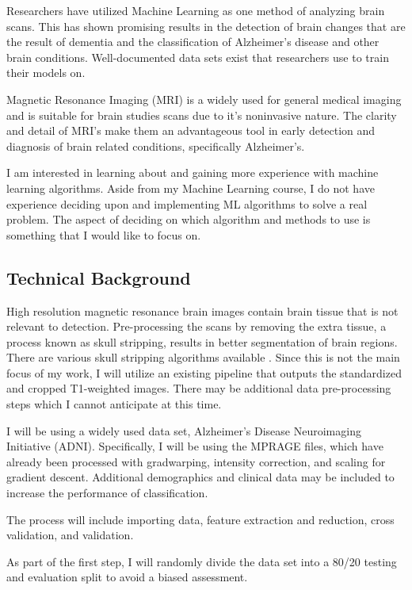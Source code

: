 \documentclass[10pt,twocolumn]{article}
\begin{document}
Researchers have utilized Machine Learning as one method of analyzing brain scans. This has shown promising results in the detection of brain changes that are the result of dementia and the classification of Alzheimer's disease and other brain conditions. Well-documented data sets exist that researchers use to train their models on. 

Magnetic Resonance Imaging (MRI) is a widely used for general medical imaging and is suitable for brain studies scans due to it's noninvasive nature. The clarity and detail of MRI's make them an advantageous tool in early detection and diagnosis of brain related conditions, specifically Alzheimer's. 

I am interested in learning about and gaining more experience with machine learning algorithms. Aside from my Machine Learning course, I do not have experience deciding upon and implementing ML algorithms to solve a real problem. The aspect of deciding on which algorithm and methods to use is something that I would like to focus on. 

\subsection{Technical Background}
High resolution magnetic resonance brain images contain brain tissue that is not relevant to detection. Pre-processing the scans by removing the extra tissue, a process known as skull stripping, results in better segmentation of brain regions. There are various skull stripping algorithms available \cite{kalavathi2016methods}. Since this is not the main focus of my work, I will utilize an existing pipeline that outputs the standardized and cropped T1-weighted images. There may be additional data pre-processing steps which I cannot anticipate at this time. 

I will be using a widely used data set, Alzheimer's Disease Neuroimaging Initiative (ADNI). Specifically, I will be using the MPRAGE files, which have already been processed with gradwarping, intensity correction, and scaling for gradient descent. Additional demographics and clinical data may be included to increase the performance of classification. 

The process will include importing data, feature extraction and reduction, cross validation, and validation.

As part of the first step, I will randomly divide the data set into a 80/20 testing and evaluation split to avoid a biased assessment.
\end{document}
